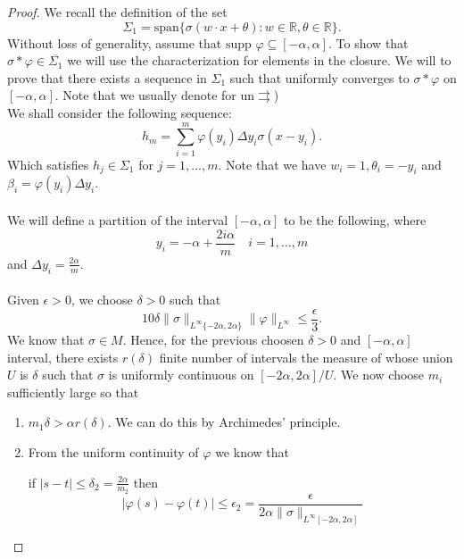\documentclass[../main.tex]{subfiles}
\begin{document}
	\begin{proof} %
		We recall the definition of the set 
		\begin{equation}
			\Sigma_1 = \text{span} \{ {\sigma(w\cdot x + \theta) : w\in \mathbb{R}, \theta \in \mathbb{R} \} }.
			\tag{1}
		\end{equation}
	Without loss of generality, assume that $\text{supp }\varphi \subseteq [-\alpha,\alpha] $.
	To show that $\sigma \ast \varphi \in \overline{\Sigma_1} $ we will use the characterization for elements in the closure. We will to prove that there exists a sequence in $\Sigma_1$ such that uniformly converges to $\sigma \ast \varphi$ on $[-\alpha,\alpha]$. Note that we usually denote for un$\rightrightarrows$) \\ 
	
	\noindent We shall consider the following sequence: 
		$$h_m= \sum_{i=1}^m\varphi(y_i)\Delta y_i \sigma(x-y_i).$$ 
		Which satisfies $h_j\in \Sigma_1$ for $j=1,...,m$. Note that we have $w_i=1,\theta_i=-y_i$ and $  \beta_i=\varphi(y_i)\Delta y_i$.\\ \\ 
		
		\noindent We will define a partition of the interval $[-\alpha,\alpha]$ to be the following, where $$y_i=-\alpha + \frac{2i\alpha}{m}\quad i=1,...,m$$ and $\Delta y_i=\frac{2\alpha}{m}$. \\ \\
		Given $\epsilon >0$, we choose $\delta >0$ such that $$10\delta \| \sigma\|_{L^\infty\{-2\alpha,2\alpha\}}\|\varphi \|_{L^\infty} \leq \frac{\epsilon}{3}.$$
		We know that $\sigma \in M$. Hence, for the previous choosen $\delta>0$ and $[-\alpha,\alpha]$ interval, there exists $r(\delta)$ finite number of intervals the measure of whose union $U$ is $\delta$ such that $\sigma$ is uniformly continuous on $[-2\alpha,2\alpha]/U$. We now choose $m_i$ sufficiently large so that
		\begin{enumerate}
			\item $m_1 \delta > \alpha r(\delta)$. We can do this by Archimedes' principle.
			\item From the uniform continuity of $\varphi$ we know that
			
			if $|s-t| \leq \delta_2= \frac{2 \alpha }{m_2}$ then $$|\varphi(s)- \varphi(t)| \leq \epsilon_2= \frac{\epsilon}{2 \alpha \| \sigma\|_{L^\infty[-2\alpha,2\alpha]}}$$
			

\end{enumerate}
\end{proof}
\end{document}
